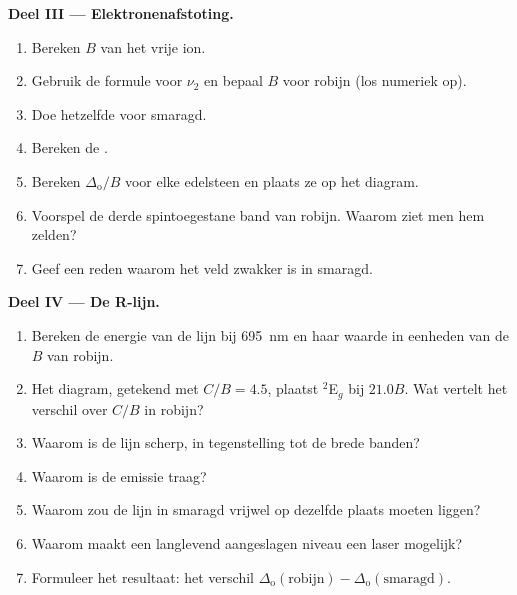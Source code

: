 \begin{problem}
\medskip\noindent\textbf{Deel III --- Elektronenafstoting.}
\begin{enumerate}[resume]
  \item Bereken $B$ van het vrije ion.
  \item Gebruik de formule voor $\nu_2$ en bepaal $B$ voor robijn (los numeriek op).
  \item Doe hetzelfde voor smaragd.
  \item Bereken de .
  \item Bereken $\Delta_{\mathrm o}/B$ voor elke edelsteen en plaats ze op het diagram.
  \item Voorspel de derde spintoegestane band van robijn. Waarom ziet men
        hem zelden?
  \item Geef een reden waarom het veld zwakker is in smaragd.
\end{enumerate}

\medskip\noindent\textbf{Deel IV --- De R-lijn.}
\begin{enumerate}[resume]
  \item Bereken de energie van de lijn bij \qty{695}{nm} en haar waarde in eenheden van de $B$ van robijn.
  \item Het diagram, getekend met $C/B = 4.5$, plaatst $^2$E$_g$ bij $21.0B$. Wat vertelt het verschil
        over $C/B$ in robijn?
  \item Waarom is de lijn scherp, in tegenstelling tot de brede banden?
  \item Waarom is de emissie traag?
  \item Waarom zou de lijn in smaragd vrijwel op dezelfde plaats moeten
        liggen?
  \item Waarom maakt een langlevend aangeslagen niveau een laser mogelijk?
  \item Formuleer het resultaat: het verschil $\Delta_{\mathrm o}(\text{robijn}) - \Delta_{\mathrm o}(\text{smaragd})$.
\end{enumerate}
\end{problem}
